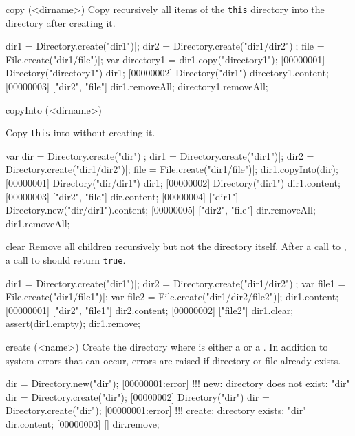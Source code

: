 \begin{urbiscriptapi}
\item[copy](<dirname>)
  Copy recursively all items of the \lstinline|this| directory
  into the directory  after creating it.
\begin{urbiscript}
dir1 = Directory.create("dir1")|;
dir2 = Directory.create("dir1/dir2")|;
file = File.create("dir1/file")|;
var directory1 = dir1.copy("directory1");
[00000001] Directory("directory1")
dir1;
[00000002] Directory("dir1")
directory1.content;
[00000003] ["dir2", "file"]
dir1.removeAll;
directory1.removeAll;
\end{urbiscript}

\item[copyInto](<dirname>)
  \experimental{}

  Copy \lstinline|this| into  without creating it.
\begin{urbiscript}
var dir = Directory.create("dir")|;
dir1 = Directory.create("dir1")|;
dir2 = Directory.create("dir1/dir2")|;
file = File.create("dir1/file")|;
dir1.copyInto(dir);
[00000001] Directory("dir/dir1")
dir1;
[00000002] Directory("dir1")
dir1.content;
[00000003] ["dir2", "file"]
dir.content;
[00000004] ["dir1"]
Directory.new("dir/dir1").content;
[00000005] ["dir2", "file"]
dir.removeAll;
dir1.removeAll;
\end{urbiscript}

\item[clear]
  Remove all children recursively but not the directory itself. After a
  call to , a call to  should return
  \lstinline|true|.
\begin{urbiscript}
dir1 = Directory.create("dir1")|;
dir2 = Directory.create("dir1/dir2")|;
var file1 = File.create("dir1/file1")|;
var file2 = File.create("dir1/dir2/file2")|;
dir1.content;
[00000001] ["dir2", "file1"]
dir2.content;
[00000002] ["file2"]
dir1.clear;
assert(dir1.empty);
dir1.remove;
\end{urbiscript}

\item[create](<name>)
  Create the directory  where  is either a
   or a . In addition to system errors that
  can occur, errors are raised if directory or file  already exists.
\begin{urbiscript}
dir = Directory.new("dir");
[00000001:error] !!! new: directory does not exist: "dir"
dir = Directory.create("dir");
[00000002] Directory("dir")
dir = Directory.create("dir");
[00000001:error] !!! create: directory exists: "dir"
dir.content;
[00000003] []
dir.remove;
\end{urbiscript}


\end{urbiscriptapi}
